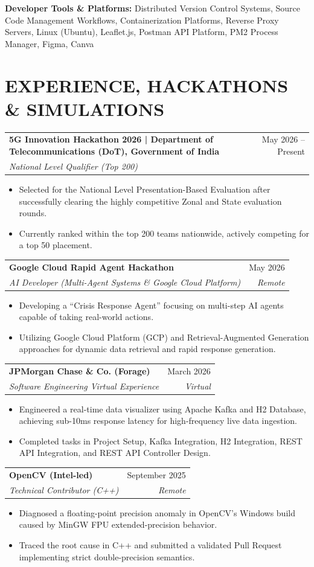 \documentclass[11pt,letterpaper]{article}
\newcommand{\resumeSubheading}[4]{
\vspace{2pt}
\begin{tabularx}{\textwidth}{X r}
\textbf{#1} & #2 \\
\textit{#3} & \textit{#4}
\end{tabularx}
\vspace{-3pt}
}
\newcommand{\resumeItem}[1]{
\item #1
}
\newcommand{\resumeItemListStart}{
\begin{itemize}[leftmargin=0.22in,itemsep=1pt,topsep=2pt]
}
\newcommand{\resumeItemListEnd}{
\end{itemize}
}
\begin{document}
\vspace{2pt}

\textbf{Developer Tools \& Platforms:}
Distributed Version Control Systems, Source Code Management Workflows, Containerization Platforms, Reverse Proxy Servers, Linux (Ubuntu), Leaflet.js, Postman API Platform, PM2 Process Manager, Figma, Canva


\section{EXPERIENCE, HACKATHONS \& SIMULATIONS}

\resumeSubheading
{5G Innovation Hackathon 2026 | Department of Telecommunications (DoT), Government of India}
{May 2026 -- Present}
{National Level Qualifier (Top 200)}
{}

\resumeItemListStart
\resumeItem{Selected for the National Level Presentation-Based Evaluation after successfully clearing the highly competitive Zonal and State evaluation rounds.}
\resumeItem{Currently ranked within the top 200 teams nationwide, actively competing for a top 50 placement.}
\resumeItemListEnd

\resumeSubheading
{Google Cloud Rapid Agent Hackathon}
{May 2026}
{AI Developer (Multi-Agent Systems \& Google Cloud Platform)}
{Remote}

\resumeItemListStart
\resumeItem{Developing a ``Crisis Response Agent'' focusing on multi-step AI agents capable of taking real-world actions.}
\resumeItem{Utilizing Google Cloud Platform (GCP) and Retrieval-Augmented Generation approaches for dynamic data retrieval and rapid response generation.}
\resumeItemListEnd

\resumeSubheading
{JPMorgan Chase \& Co. (Forage)}
{March 2026}
{Software Engineering Virtual Experience}
{Virtual}

\resumeItemListStart
\resumeItem{Engineered a real-time data visualizer using Apache Kafka and H2 Database, achieving sub-10ms response latency for high-frequency live data ingestion.}
\resumeItem{Completed tasks in Project Setup, Kafka Integration, H2 Integration, REST API Integration, and REST API Controller Design.}
\resumeItemListEnd

\resumeSubheading
{OpenCV (Intel-led)}
{September 2025}
{Technical Contributor (C++)}
{Remote}

\resumeItemListStart
\resumeItem{Diagnosed a floating-point precision anomaly in OpenCV's Windows build caused by MinGW FPU extended-precision behavior.}
\resumeItem{Traced the root cause in C++ and submitted a validated Pull Request implementing strict double-precision semantics.}
\resumeItemListEnd
\end{document}
